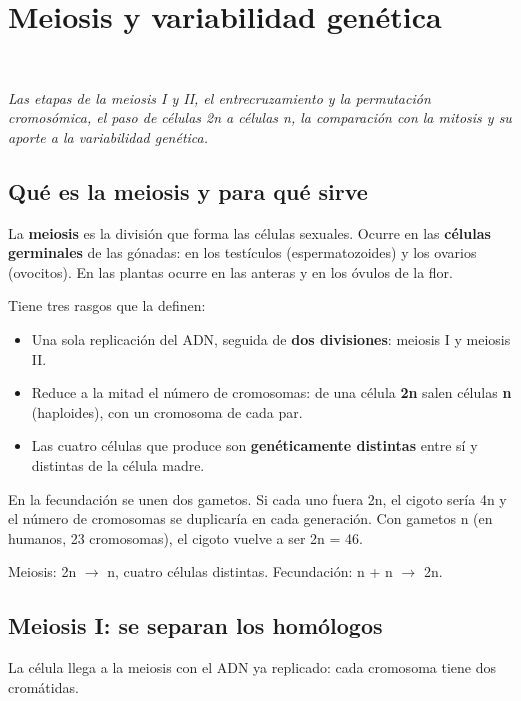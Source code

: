 \section[Meiosis y variabilidad genética]{Meiosis y variabilidad genética}
\modcomun\ \ {\color{gris}\itshape Las etapas de la meiosis I y II, el entrecruzamiento y la permutación cromosómica, el paso de células 2n a células n, la comparación con la mitosis y su aporte a la variabilidad genética.\par}
\subsection{Qué es la meiosis y para qué sirve}
La \textbf{meiosis} es la división que forma las células sexuales. Ocurre en las \textbf{células germinales} de las gónadas: en los testículos (espermatozoides) y los ovarios (ovocitos). En las plantas ocurre en las anteras y en los óvulos de la flor.

 

Tiene tres rasgos que la definen:

 
\begin{itemize}
  \item Una sola replicación del ADN, seguida de \textbf{dos divisiones}: meiosis I y meiosis II.
  \item Reduce a la mitad el número de cromosomas: de una célula \textbf{2n} salen células \textbf{n} (haploides), con un cromosoma de cada par.
  \item Las cuatro células que produce son \textbf{genéticamente distintas} entre sí y distintas de la célula madre.
\end{itemize}
  
\begin{clave} En la fecundación se unen dos gametos. Si cada uno fuera 2n, el cigoto sería 4n y el número de cromosomas se duplicaría en cada generación. Con gametos n (en humanos, 23 cromosomas), el cigoto vuelve a ser 2n = 46.\end{clave}
 
\begin{clave}[{Recuerda}] Meiosis: 2n \ensuremath{\rightarrow} n, cuatro células distintas. Fecundación: n + n \ensuremath{\rightarrow} 2n.\end{clave}
\subsection{Meiosis I: se separan los homólogos}
La célula llega a la meiosis con el ADN ya replicado: cada cromosoma tiene dos cromátidas.

